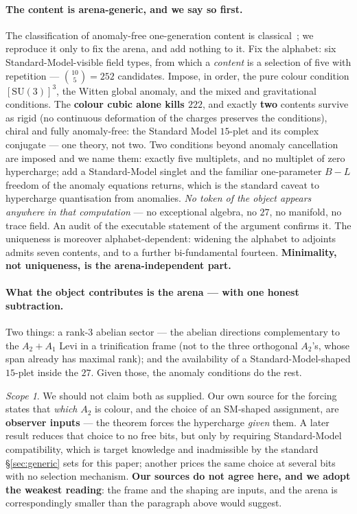 \documentclass[11pt,a4paper]{article}
\theoremstyle{definition}
\theoremstyle{remark}
\newtheorem{scopenote}{Scope}
\begin{document}
\paragraph{The content is arena-generic, and we say so first.} The classification of anomaly-free one-generation content
is classical~\cite{gm,mrw,fjlv}; we reproduce it only to fix the arena, and add nothing to it. Fix the alphabet: six
Standard-Model-visible field types, from which a \emph{content} is a selection of five with
repetition --- $\binom{10}{5} = 252$ candidates. Impose, in order, the pure colour condition
$[\mathrm{SU}(3)]^3$, the Witten global anomaly, and the mixed and gravitational conditions. The
\textbf{colour cubic alone kills $222$}, and exactly \textbf{two} contents survive as rigid (no continuous deformation of the charges preserves the conditions), chiral
and fully anomaly-free: the Standard Model $15$-plet and its complex conjugate --- one theory, not two. Two conditions beyond anomaly
cancellation are imposed and we name them: exactly five multiplets, and no multiplet of zero hypercharge; add a Standard-Model
singlet and the familiar one-parameter $B\!-\!L$ freedom of the anomaly equations returns, which is the standard caveat to
hypercharge quantisation from anomalies. \emph{No token of the object appears
anywhere in that computation} --- no exceptional algebra, no $27$, no manifold, no trace field. An
audit of the executable statement of the argument confirms it. The uniqueness is moreover
alphabet-dependent: widening the alphabet to adjoints admits seven contents, and to a further
bi-fundamental fourteen. \textbf{Minimality, not uniqueness, is the arena-independent part.}

\paragraph{What the object contributes is the arena --- with one honest subtraction.} Two things: a
rank-3 abelian sector --- the abelian directions complementary to the $A_2{+}A_1$ Levi in a trinification frame (not to
the three orthogonal $A_2$'s, whose span already has maximal rank); and the availability of a Standard-Model-shaped $15$-plet
inside the $27$. Given those, the anomaly conditions do the rest.

\begin{scopenote}
We should not claim both as supplied. Our own source for the forcing states that \emph{which} $A_2$
is colour, and the choice of an SM-shaped assignment, are \textbf{observer inputs} --- the theorem
forces the hypercharge \emph{given} them. A later result reduces that choice to no free bits, but
only by requiring Standard-Model compatibility, which is target knowledge and inadmissible by the
standard \S\ref{sec:generic} sets for this paper; another prices the same choice at several bits with
no selection mechanism. \textbf{Our sources do not agree here, and we adopt the weakest reading}: the
frame and the shaping are inputs, and the arena is correspondingly smaller than the paragraph above
would suggest.
\end{scopenote}
\end{document}
